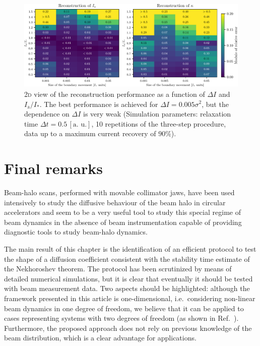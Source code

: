 {\begin{figure}[t]
    \centering
    \includegraphics[width=\textwidth]{4_probing_the_diffusive_behavior/figs/final/MULTI_different_step_size.pdf}
    \caption{2\textsc{d} view of the reconstruction performance as a function of $\Delta I$ and $I_\mathrm{a}/I_\ast$. The  best performance is achieved for $\Delta I = 0.005 \sigma^2$, but the dependence on $\Delta I$ is very weak (Simulation parameters: relaxation time $\Delta t=0.5 \, [\text{a. u.}]$, 10 repetitions of the three-step procedure, data up to a maximum current recovery of $90\%$).}
    \label{fig:different_movement_module}
\end{figure}


\section{Final remarks}
\label{sec:conclusions}


Beam-halo scans, performed with movable collimator jaws, have been used intensively to study the diffusive behaviour of the beam halo in circular accelerators and seem to be a very useful tool to study this special regime of beam dynamics in the absence of beam instrumentation capable of providing diagnostic tools to study beam-halo dynamics.

{The main result of this chapter} is the identification of an efficient protocol to test the shape of {a diffusion coefficient consistent with the stability time estimate of the Nekhoroshev theorem}. The protocol has been scrutinized by means of detailed numerical simulations, but it is clear that eventually it should be tested with beam measurement data. Two aspects should be highlighted: although the framework presented in this article is one-dimensional, i.e.\ considering non-linear beam dynamics in one degree of freedom, we believe that it can be applied to cases representing systems with two degrees of freedom (as shown in Ref.~\cite{bazzani2020diffusion}). Furthermore, the proposed approach does not rely on previous knowledge of the beam distribution, which is a clear advantage for applications. 
 
}
